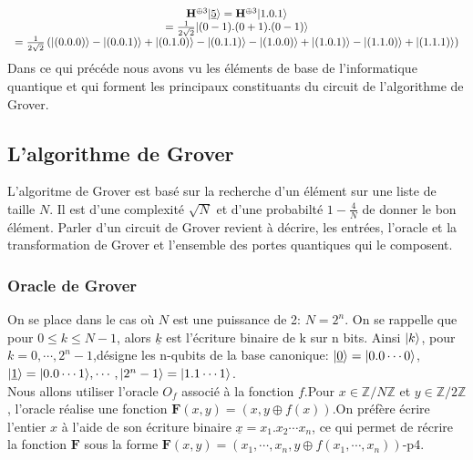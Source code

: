 \documentclass[12pt,openany]{report}
\DeclarePairedDelimiter\ket{\lvert}{\rangle}
\begin{document}
\[  
 \left.
\begin{array}{ c  c }
\mathbf{H}^{\oplus 3} \ket{\underline{5}}= \mathbf{H}^{\oplus 3} \ket{1.0.1}\\
 = \frac{1}{2\sqrt{2}}\ket{(0-1).(0+1).(0-1)}\\
 = \frac{1}{2\sqrt{2}}\left( \ket{(0.0.0)}-\ket{(0.0.1)}+\ket{(0.1.0)}-\ket{(0.1.1)}-\ket{(1.0.0)}+\ket{(1.0.1)}-\ket{(1.1.0)}+\ket{(1.1.1)}\right) \\
\end{array}
\right.
\]
Dans ce qui précéde nous avons vu les éléments de base de l'informatique quantique et qui forment les principaux constituants du circuit de l'algorithme de Grover.

\subsection{L'algorithme de Grover}
L'algoritme de Grover est basé sur la recherche d'un  élément sur une liste de taille $N $. Il est d'une complexité 
$\sqrt{N} $ et d'une probabilté $1-\frac{4}{N}$ de donner le bon élément. Parler d'un circuit de Grover revient à décrire, les entrées, l'oracle et la transformation de Grover et l'ensemble des portes quantiques qui le composent.


\subsubsection{Oracle de Grover}
On se place dans le cas où $N $ est une puissance de 2: $N=2^n $. On se rappelle que pour $0 \leq k \leq N-1  $, alors $ \underline{k}$ est l'écriture binaire de k sur n bits. Ainsi $\ket{k} $, pour 
$k=0,\cdots,2^{n}-1 $,désigne les n-qubits de la base canonique: $\ket{\underline{0}}=\ket{0.0\cdots0}  $,$ \ket{\underline{1}}=\ket{0.0\cdots 1} ,\cdots,\ket{2^n-1}=\ket{1.1\cdots 1}$.\\
Nous allons utiliser l'oracle $O_f  $ associé à la fonction $f$.Pour $ x \in \mathbb{Z}/N \mathbb{Z} $ et $ y \in \mathbb{Z}/2 \mathbb{Z}  $, l'oracle réalise une fonction $\mathbf{F}(x,y)=(x,y\oplus f(x))  $.On préfère écrire l'entier $x$ à l'aide de son écriture binaire $\underline{x}=x_1 . x_2 \cdots x_n  $, ce qui permet de récrire la fonction $\mathbf{F} $ sous la forme $ \mathbf{F}(x,y)=(x_1,\cdots,x_n,y\oplus f(x_1,\cdots,x_n))    $\cite{Arnaud}-p4.
\end{document}
